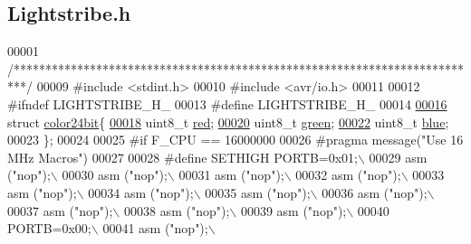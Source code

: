 \hypertarget{_lightstribe_8h_source}{}\subsection{Lightstribe.\+h}

\begin{DoxyCode}
00001 \textcolor{comment}{/**************************************************************************/}
00009 \textcolor{preprocessor}{#include <stdint.h>}
00010 \textcolor{preprocessor}{#include <avr/io.h>}
00011 
00012 \textcolor{preprocessor}{#ifndef LIGHTSTRIBE\_H\_}
00013 \textcolor{preprocessor}{#define LIGHTSTRIBE\_H\_}
00014 
\hypertarget{_lightstribe_8h_source_l00016}{}\hyperlink{structcolor24bit}{00016} \textcolor{keyword}{struct }\hyperlink{structcolor24bit}{color24bit}\{
\hypertarget{_lightstribe_8h_source_l00018}{}\hyperlink{structcolor24bit_ad47d918910aaa51c73160ac85999d09c}{00018}     uint8\_t \hyperlink{structcolor24bit_ad47d918910aaa51c73160ac85999d09c}{red}; 
\hypertarget{_lightstribe_8h_source_l00020}{}\hyperlink{structcolor24bit_a90d21fa503b626c00cdc8d94863d5877}{00020}     uint8\_t \hyperlink{structcolor24bit_a90d21fa503b626c00cdc8d94863d5877}{green}; 
\hypertarget{_lightstribe_8h_source_l00022}{}\hyperlink{structcolor24bit_a287b397e90d7b995c81ff54e741f96b2}{00022}     uint8\_t \hyperlink{structcolor24bit_a287b397e90d7b995c81ff54e741f96b2}{blue};                               
00023 \};
00024 
00025 \textcolor{preprocessor}{#if F\_CPU == 16000000}
00026 \textcolor{preprocessor}{#pragma message("Use 16 MHz Macros")}
00027 
00028 \textcolor{preprocessor}{#define SETHIGH PORTB=0x01;\(\backslash\)}
00029 \textcolor{preprocessor}{               asm ("nop");\(\backslash\)}
00030 \textcolor{preprocessor}{               asm ("nop");\(\backslash\)}
00031 \textcolor{preprocessor}{               asm ("nop");\(\backslash\)}
00032 \textcolor{preprocessor}{               asm ("nop");\(\backslash\)}
00033 \textcolor{preprocessor}{               asm ("nop");\(\backslash\)}
00034 \textcolor{preprocessor}{               asm ("nop");\(\backslash\)}
00035 \textcolor{preprocessor}{               asm ("nop");\(\backslash\)}
00036 \textcolor{preprocessor}{               asm ("nop");\(\backslash\)}
00037 \textcolor{preprocessor}{               asm ("nop");\(\backslash\)}
00038 \textcolor{preprocessor}{               asm ("nop");\(\backslash\)}
00039 \textcolor{preprocessor}{               asm ("nop");\(\backslash\)}
00040 \textcolor{preprocessor}{               PORTB=0x00;\(\backslash\)}
00041 \textcolor{preprocessor}{               asm ("nop");\(\backslash\)}

\end{DoxyCode}
